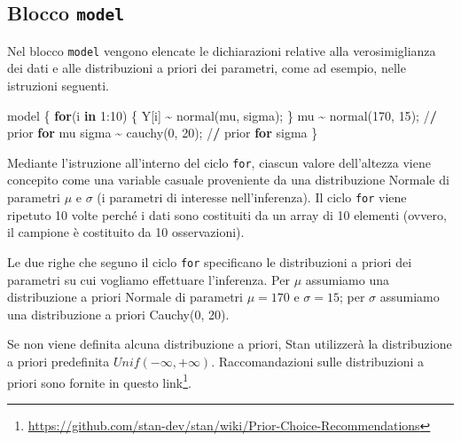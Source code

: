 \documentclass[
  11pt,
]{krantz}
\makeatletter
\newenvironment{Shaded}{\begin{snugshade}}{\end{snugshade}}
\newcommand{\ControlFlowTok}[1]{\textcolor[rgb]{0.27,0.27,0.27}{\textbf{#1}}}
\newcommand{\DecValTok}[1]{\textcolor[rgb]{0.06,0.06,0.06}{#1}}
\newcommand{\ErrorTok}[1]{\textcolor[rgb]{0.14,0.14,0.14}{\textbf{#1}}}
\newcommand{\FunctionTok}[1]{\textcolor[rgb]{0,0,0}{#1}}
\newcommand{\NormalTok}[1]{#1}
\newcommand{\SpecialCharTok}[1]{\textcolor[rgb]{0,0,0}{#1}}
\renewcommand{\href}[2]{#2\footnote{\url{#1}}}
\newenvironment{kframe}{%
\medskip{}
\setlength{\fboxsep}{.8em}
 \def\at@end@of@kframe{}%
 \ifinner\ifhmode%
  \def\at@end@of@kframe{\end{minipage}}%
  \begin{minipage}{\columnwidth}%
 \fi\fi%
 \def\FrameCommand##1{\hskip\@totalleftmargin \hskip-\fboxsep
 \colorbox{shadecolor}{##1}\hskip-\fboxsep
     \hskip-\linewidth \hskip-\@totalleftmargin \hskip\columnwidth}%
 \MakeFramed {\advance\hsize-\width
   \@totalleftmargin\z@ \linewidth\hsize
   \@setminipage}}%
 {\par\unskip\endMakeFramed%
 \at@end@of@kframe}
\renewenvironment{Shaded}{\begin{kframe}}{\end{kframe}}
\theoremstyle{definition}
\theoremstyle{definition}
\theoremstyle{definition}
\theoremstyle{definition}
\theoremstyle{remark}
\makeatother
\begin{document}
\hypertarget{blocco-model}{%
\subsection{\texorpdfstring{Blocco \texttt{model}}{Blocco model}}\label{blocco-model}}

Nel blocco \texttt{model} vengono elencate le dichiarazioni relative alla verosimiglianza dei dati e alle distribuzioni a priori dei parametri, come ad esempio, nelle istruzioni seguenti.

\begin{Shaded}
\begin{Highlighting}[]
\NormalTok{model \{}
  \ControlFlowTok{for}\NormalTok{(i }\ControlFlowTok{in} \DecValTok{1}\SpecialCharTok{:}\DecValTok{10}\NormalTok{) \{}
\NormalTok{    Y[i] }\SpecialCharTok{\textasciitilde{}} \FunctionTok{normal}\NormalTok{(mu, sigma);}
\NormalTok{  \}}
\NormalTok{  mu }\SpecialCharTok{\textasciitilde{}} \FunctionTok{normal}\NormalTok{(}\DecValTok{170}\NormalTok{, }\DecValTok{15}\NormalTok{); }\SpecialCharTok{/}\ErrorTok{/}\NormalTok{ prior }\ControlFlowTok{for}\NormalTok{ mu}
\NormalTok{  sigma }\SpecialCharTok{\textasciitilde{}} \FunctionTok{cauchy}\NormalTok{(}\DecValTok{0}\NormalTok{, }\DecValTok{20}\NormalTok{); }\SpecialCharTok{/}\ErrorTok{/}\NormalTok{ prior }\ControlFlowTok{for}\NormalTok{ sigma}
\NormalTok{\}}
\end{Highlighting}
\end{Shaded}

Mediante l'istruzione all'interno del ciclo \texttt{for}, ciascun valore dell'altezza viene concepito come una variable casuale proveniente da una distribuzione Normale di parametri \(\mu\) e \(\sigma\) (i parametri di interesse nell'inferenza). Il ciclo \texttt{for} viene ripetuto 10 volte perché i dati sono costituiti da un array di 10 elementi (ovvero, il campione è costituito da 10 osservazioni).

Le due righe che seguno il ciclo \texttt{for} specificano le distribuzioni a priori dei parametri su cui vogliamo effettuare l'inferenza. Per \(\mu\) assumiamo una distribuzione a priori Normale di parametri \(\mu = 170\) e \(\sigma = 15\); per \(\sigma\) assumiamo una distribuzione a priori Cauchy(0, 20).

Se non viene definita alcuna distribuzione a priori, Stan utilizzerà la distribuzione a priori predefinita \(Unif(-\infty, +\infty)\). Raccomandazioni sulle distribuzioni a priori sono fornite in questo \href{https://github.com/stan-dev/stan/wiki/Prior-Choice-Recommendations}{link}.
\end{document}
